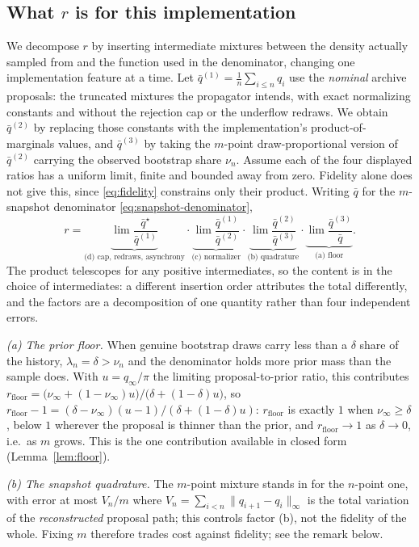 \documentclass[10pt]{article}
\theoremstyle{plain}
\theoremstyle{definition}
\begin{document}
\subsection{What $r$ is for this implementation}\label{sec:theory-r}
We decompose $r$ by inserting intermediate mixtures between the density actually sampled from and the function used in the denominator, changing one implementation feature at a time. Let $\bar q^{(1)}=\tfrac1n\sum_{i\le n}q_i$ use the \emph{nominal} archive proposals: the truncated mixtures the propagator intends, with exact normalizing constants and without the rejection cap or the underflow redraws. We obtain $\bar q^{(2)}$ by replacing those constants with the implementation's product-of-marginals values, and $\bar q^{(3)}$ by taking the $m$-point draw-proportional version of $\bar q^{(2)}$ carrying the observed bootstrap share $\nu_n$. Assume each of the four displayed ratios has a uniform limit, finite and bounded away from zero. Fidelity alone does not give this, since \eqref{eq:fidelity} constrains only their product. Writing $\bar q$ for the $m$-snapshot denominator \eqref{eq:snapshot-denominator},
\[
r=\underbrace{\lim\frac{\bar q^\star}{\bar q^{(1)}}}_{\text{(d) cap, redraws, asynchrony}}\cdot
\underbrace{\lim\frac{\bar q^{(1)}}{\bar q^{(2)}}}_{\text{(c) normalizer}}\cdot
\underbrace{\lim\frac{\bar q^{(2)}}{\bar q^{(3)}}}_{\text{(b) quadrature}}\cdot
\underbrace{\lim\frac{\bar q^{(3)}}{\bar q}}_{\text{(a) floor}} .
\]
The product telescopes for any positive intermediates, so the content is in the choice of intermediates: a different insertion order attributes the total differently, and the factors are a decomposition of one quantity rather than four independent errors.

\emph{(a) The prior floor.} When genuine bootstrap draws carry less than a $\delta$ share of the history, $\lambda_n=\delta>\nu_n$ and the denominator holds more prior mass than the sample does. With $u=q_\infty/\pi$ the limiting proposal-to-prior ratio, this contributes
$r_{\mathrm{floor}}=\bigl(\nu_\infty+(1-\nu_\infty)u\bigr)/\bigl(\delta+(1-\delta)u\bigr)$, so $r_{\mathrm{floor}}-1=(\delta-\nu_\infty)(u-1)/(\delta+(1-\delta)u)$: $r_{\mathrm{floor}}$ is exactly $1$ when $\nu_\infty\ge\delta$, below $1$ wherever the proposal is thinner than the prior, and $r_{\mathrm{floor}}\to1$ as $\delta\to0$, i.e.\ as $m$ grows. This is the one contribution available in closed form (Lemma~\ref{lem:floor}).

\emph{(b) The snapshot quadrature.} The $m$-point mixture stands in for the $n$-point one, with error at most $V_n/m$ where $V_n=\sum_{i<n}\|q_{i+1}-q_i\|_\infty$ is the total variation of the \emph{reconstructed} proposal path; this controls factor (b), not the fidelity of the whole. Fixing $m$ therefore trades cost against fidelity; see the remark below.
\end{document}

